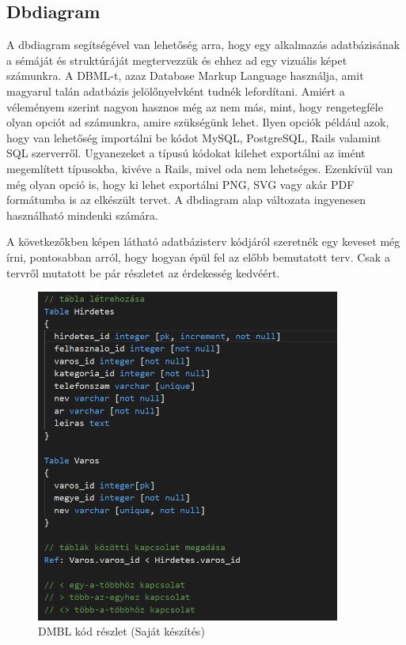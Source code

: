 \documentclass[]{thesis-ekf}
\theoremstyle{definition}
\theoremstyle{remark}
\begin{document}
	\subsection{Dbdiagram}
	A dbdiagram segítségével van lehetőség arra, hogy egy alkalmazás adatbázisának a sémáját és struktúráját megtervezzük és ehhez ad egy vizuális képet számunkra. A DBML-t, azaz Database Markup Language használja, amit magyarul talán adatbázis jelölőnyelvként tudnék lefordítani. Amiért a véleményem szerint nagyon hasznos még az nem más, mint, hogy rengetegféle olyan opciót ad számunkra, amire szükségünk lehet. Ilyen opciók például azok, hogy van lehetőség importálni be kódot MySQL, PostgreSQL, Rails valamint SQL szerverről. Ugyanezeket a típusú kódokat kilehet exportálni az imént megemlített típusokba, kivéve a Rails, mivel oda nem lehetséges. Ezenkívül van még olyan opció is, hogy ki lehet exportálni PNG, SVG vagy akár PDF formátumba is az elkészült tervet. A dbdiagram alap változata ingyenesen használható mindenki számára. \cite{Dbdiagram}
	
	A következőkben  képen látható adatbázisterv kódjáról szeretnék egy keveset még írni, pontosabban arról, hogy hogyan épül fel az előbb bemutatott terv. Csak a tervről mutatott be pár részletet az érdekesség kedvéért.
	
	\begin{figure}[ht!]
		\centering
		\includegraphics[width=10cm]{./tervezes/dbKod}
		\caption{DMBL kód részlet (Saját készítés)} 
		\label{dbKod}
	\end{figure}
	
\end{document}
